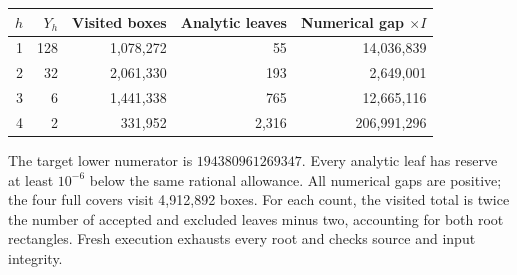\begin{center}
\begin{tabular}{rrrrr}
\toprule $h$ & $Y_h$ & Visited boxes & Analytic leaves & Numerical gap $\times I$\\\midrule
1 & 128 & 1,078,272 & 55 & 14,036,839\\
2 & 32 & 2,061,330 & 193 & 2,649,001\\
3 & 6 & 1,441,338 & 765 & 12,665,116\\
4 & 2 & 331,952 & 2,316 & 206,991,296\\
\bottomrule\end{tabular}
\end{center}
The target lower numerator is $194380961269347$. Every analytic leaf
has reserve at least $10^{-6}$ below the same rational allowance.
All numerical gaps are positive; the four full covers visit 4,912,892 boxes.
For each count, the visited total is twice the number of accepted and
excluded leaves minus two, accounting for both root rectangles. Fresh
execution exhausts every root and checks source and input integrity.
